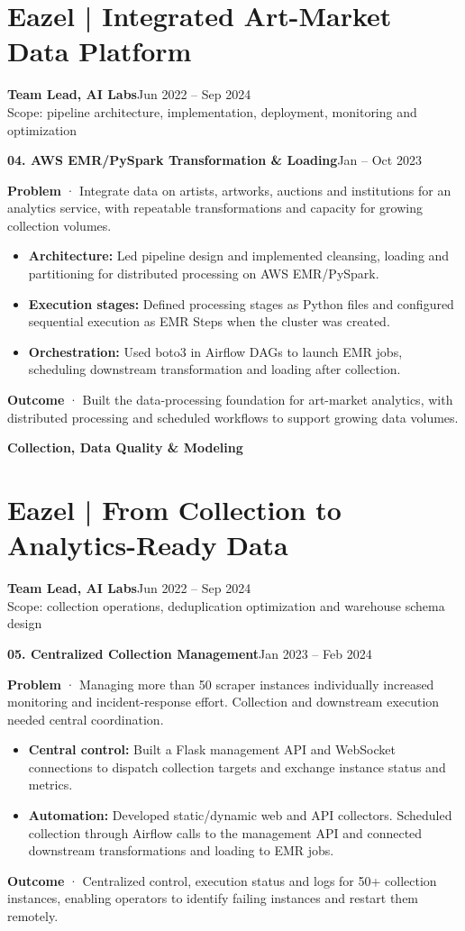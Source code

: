 \documentclass[a4paper,10pt]{article}
\newcommand{\role}[3]{\textbf{#1}\hfill{\small #2}\\{\small\color{muted}#3}\par}
\newcommand{\project}[2]{\vspace{5pt}\textbf{\color{accent}#1}\hfill{\small\color{muted}#2}\par}
\begin{document}
\section{Eazel | Integrated Art-Market Data Platform}
\role{Team Lead, AI Labs}{Jun 2022 -- Sep 2024}{Scope: pipeline architecture, implementation, deployment, monitoring and optimization}
\project{04. AWS EMR/PySpark Transformation \& Loading}{Jan -- Oct 2023}
\textbf{Problem} · Integrate data on artists, artworks, auctions and institutions for an analytics service, with repeatable transformations and capacity for growing collection volumes.
\begin{itemize}
\item \textbf{Architecture:} Led pipeline design and implemented cleansing, loading and partitioning for distributed processing on AWS EMR/PySpark.
\item \textbf{Execution stages:} Defined processing stages as Python files and configured sequential execution as EMR Steps when the cluster was created.
\item \textbf{Orchestration:} Used boto3 in Airflow DAGs to launch EMR jobs, scheduling downstream transformation and loading after collection.
\end{itemize}
\textbf{Outcome} · Built the data-processing foundation for art-market analytics, with distributed processing and scheduled workflows to support growing data volumes.

\newpage
{\fontsize{21}{27}\selectfont\bfseries\color{accent}Collection, Data Quality \& Modeling}\par
\section{Eazel | From Collection to Analytics-Ready Data}
\role{Team Lead, AI Labs}{Jun 2022 -- Sep 2024}{Scope: collection operations, deduplication optimization and warehouse schema design}
\project{05. Centralized Collection Management}{Jan 2023 -- Feb 2024}
\textbf{Problem} · Managing more than 50 scraper instances individually increased monitoring and incident-response effort. Collection and downstream execution needed central coordination.
\begin{itemize}
\item \textbf{Central control:} Built a Flask management API and WebSocket connections to dispatch collection targets and exchange instance status and metrics.
\item \textbf{Automation:} Developed static/dynamic web and API collectors. Scheduled collection through Airflow calls to the management API and connected downstream transformations and loading to EMR jobs.
\end{itemize}
\textbf{Outcome} · Centralized control, execution status and logs for 50+ collection instances, enabling operators to identify failing instances and restart them remotely.
\end{document}
